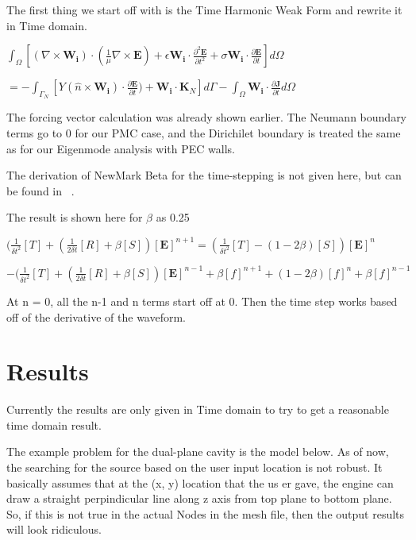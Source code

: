 \documentclass[11pt,a4paper,oldfontcommands]{memoir}
\begin{document}
The first thing we start off with is the Time Harmonic Weak Form and rewrite it in Time domain.

$\int_{\Omega}[(\nabla\times \mathbf{W_i}) \cdot (\frac{1}{\mu}\nabla \times \mathbf{E})  + \epsilon \mathbf{W_i} \cdot \frac{\partial^2\mathbf{E}}{\partial t^2} + \sigma\mathbf{W_i}\cdot\frac{\partial\mathbf{E}}{\partial t}] d \Omega$

$=  -\int_{\Gamma_{N}}[Y(\hat{n} \times \mathbf{W_i})\cdot\frac{\partial\mathbf{E}}{\partial t}) + \mathbf{W_i} \cdot \mathbf{K}_N] d\Gamma -\int_{\Omega}\mathbf{W_i}\cdot\frac{\partial\mathbf{J}}{\partial t} d\Omega$

The forcing vector calculation was already shown earlier. The Neumann boundary terms go to 0 for our PMC case, and the Dirichilet boundary is treated the same as for our Eigenmode analysis with PEC walls.

The derivation of NewMark Beta for the time-stepping is not given here, but can be found in ~\cite{Jin}.

The result is shown here for $\beta$ as 0.25

$ (\frac{1}{\delta t^2} [T] + (\frac{1}{2\delta t} [R] + \beta [S]) [\mathbf{E}]^{n+1} =  (\frac{1}{\delta t^2} [T] - (1-2\beta ) [S]) [\mathbf{E}]^n$

$-(\frac{1}{\delta t^2} [T] + (\frac{1}{2\delta t} [R] + \beta [S]) [\mathbf{E}]^{n-1} + \beta [f]^{n+1} + (1- 2\beta )[f]^{n} + \beta [f]^{n-1}$


At n = 0, all the n-1 and n terms start off at 0. Then the time step works based off of the derivative of the waveform.

\section{Results}
Currently the results are only given in Time domain to try to get a reasonable time domain result.

The example problem for the dual-plane cavity is the model below. As of now, the searching for the source based on the user input location is not robust. It basically assumes that at the (x, y) location that the us er gave, the engine can draw a straight perpindicular line along z axis from top plane to bottom plane. So, if this is not true in the actual Nodes in the mesh file, then the output results will look ridiculous. 
\end{document}
